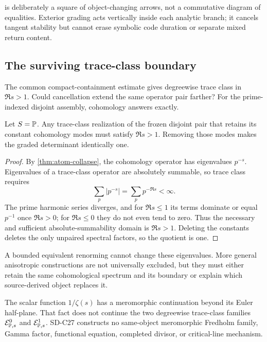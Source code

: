  is deliberately a square of object-changing arrows,
not a commutative diagram of equalities.  Exterior grading acts vertically
inside each analytic branch; it cancels tangent stability but cannot erase
symbolic code duration or separate mixed return content.

\subsection{The surviving trace-class boundary}

The common compact-containment estimate gives degreewise trace class in
\(\Re s>1\).  Could cancellation extend the same operator pair farther?
For the prime-indexed disjoint assembly, cohomology answers exactly.

\begin{corollary}
\label{cor:no-halfplane-gain}
Let \(S=\mathbb P\).  Any trace-class realization of the frozen disjoint pair that
retains its constant cohomology modes must satisfy \(\Re s>1\).  Removing
those modes makes the graded determinant identically one.
\end{corollary}

\begin{proof}
By \cref{thm:atom-collapse}, the cohomology operator has eigenvalues
\(p^{-s}\).  Eigenvalues of a trace-class operator are absolutely summable,
so trace class requires
\[
        \sum_p|p^{-s}|=\sum_pp^{-\Re s}<\infty.
\]
The prime harmonic series diverges, and for \(\Re s\le1\) its terms dominate
or equal \(p^{-1}\) once \(\Re s>0\); for \(\Re s\le0\) they do not even
tend to zero.  Thus the necessary and sufficient absolute-summability
domain is \(\Re s>1\).  Deleting the constants deletes the only unpaired
spectral factors, so the quotient is one.
\end{proof}

A bounded equivalent renorming cannot change these eigenvalues.  More
general anisotropic constructions are not universally excluded, but they
must either retain the same cohomological spectrum and its boundary or
explain which source-derived object replaces it.

The scalar function \(1/\zeta(s)\) has a meromorphic continuation beyond
its Euler half-plane.  That fact does not continue the two degreewise
trace-class families \(\mathcal E^0_{\mathbb P,s}\) and \(\mathcal E^1_{\mathbb P,s}\).  SD-C27
constructs no same-object meromorphic Fredholm family, Gamma factor,
functional equation, completed divisor, or critical-line mechanism.
